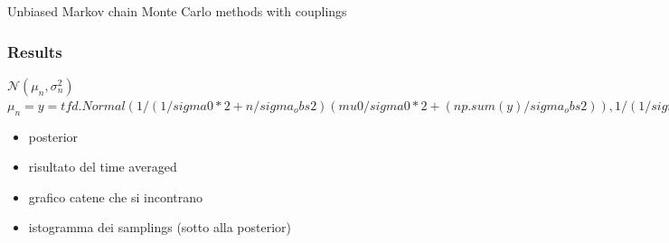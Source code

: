 \documentclass{beamer}
\begin{document}
\begin{section}{Unbiased Markov chain Monte Carlo methods with couplings}
	\begin{frame}
		\frametitle{Results}
		
		$\mathcal{N}(\mu_n, \sigma^2_n)$
		$\mu_n = 
		y= tfd.Normal(
		1/(1/sigma0*2 + n/sigma_obs2)(mu0/sigma0*2 + (np.sum(y)/sigma_obs2)),
		1/(1/sigma02 + n/sigma_obs*2)
		)   
		$

		\begin{itemize}
			\item posterior
			\item risultato del time averaged
			\item grafico catene che si incontrano
			\item istogramma dei samplings (sotto alla posterior)
		\end{itemize}
	\end{frame}
	
\end{section}
\end{document}
